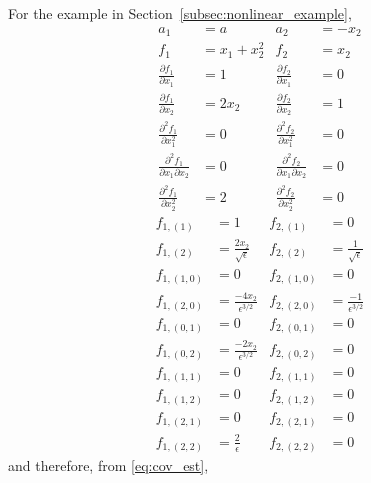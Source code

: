 For the example in Section~\ref{subsec:nonlinear_example}, 
\begin{equation}
\begin{aligned}
a_1 &= a 
&
a_2 &= -x_2
\\
f_1 &= x_1 + x_2^2 
&
f_2 &= x_2 
\\
\frac{\partial f_1}{\partial x_1} &= 1
&
\frac{\partial f_2}{\partial x_1} &= 0 
\\
\frac{\partial f_1}{\partial x_2} &= 2 x_2
&
\frac{\partial f_2}{\partial x_2} &= 1 
\\
\frac{\partial^2 f_1}{\partial x_1^2} &= 0
&
\frac{\partial^2 f_2}{\partial x_1^2} &= 0
\\
\frac{\partial^2 f_1}{\partial x_1 \partial x_2} &= 0
&
\frac{\partial^2 f_2}{\partial x_1 \partial x_2} &= 0
\\
\frac{\partial^2 f_1}{\partial x_2^2 } &= 2
&
\frac{\partial^2 f_2}{\partial x_2^2} &= 0
\end{aligned}
\end{equation}
%
\begin{equation}
\begin{aligned}
f_{1,(1)} &= 1
&
f_{2,(1)} &= 0
\\
f_{1,(2)} &= \frac{2 x_2}{\sqrt{\epsilon}}
&
f_{2,(2)} &= \frac{1}{\sqrt{\epsilon}}
\\
f_{1,(1,0)} &= 0
&
f_{2,(1,0)} &= 0
\\
f_{1,(2,0)} &= \frac{-4 x_2}{\epsilon^{3/2}} 
&
f_{2,(2,0)} &= \frac{-1}{\epsilon^{3/2}}
\\
f_{1,(0,1)} &= 0
&
f_{2,(0,1)} &= 0
\\
f_{1,(0,2)} &= \frac{-2 x_2}{\epsilon^{3/2}} 
&
f_{2,(0,2)} &= 0
\\
f_{1,(1,1)} &= 0
&
f_{2,(1,1)} &= 0
\\
f_{1,(1,2)} &= 0
&
f_{2,(1,2)} &= 0
\\
f_{1,(2,1)} &= 0
&
f_{2,(2,1)} &= 0
\\
f_{1,(2,2)} &= \frac{2}{\epsilon}
&
f_{2,(2,2)} &= 0
\end{aligned}
\end{equation}
%
and therefore, from \eqref{eq:cov_est}, 
%
